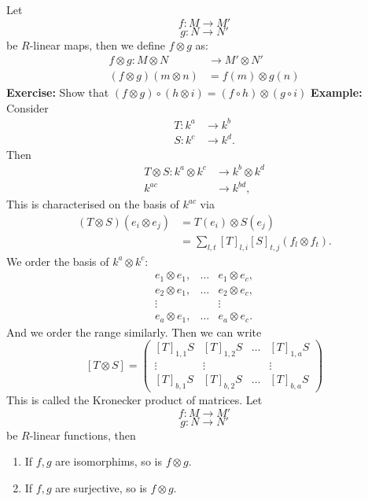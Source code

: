 \documentclass{article}
\begin{document}
    Let \[ f : M \to M'\] \[ g: N \to N' \]
    be $R$-linear maps, then we define $f \otimes g$ as: \begin{align*}
        f \otimes g : M \otimes N &\to M' \otimes N'\\
        (f \otimes g)(m \otimes n) &= f(m) \otimes g(n)
    \end{align*}
    \textbf{Exercise: } Show that $(f \otimes g) \circ (h \otimes i) = (f \circ h) \otimes (g \circ i)$ \gap
    \textbf{Example:} Consider \begin{align*}
        T : k^{a} &\to k^{b}\\
        S : k^{c} &\to k^{d}.
    \end{align*}
    Then \begin{align*}
        T \otimes S : k^{a} \otimes k^{c} &\to k^{b} \otimes k^{d}\\
                      k^{ac} &\to k^{bd},
    \end{align*}
    This is characterised on the basis of $k^{ac}$ via \begin{align*}
        (T \otimes S)(e_{i} \otimes e_{j}) &= T(e_{i}) \otimes S(e_{j})\\
        &= \sum_{l,t} \left[T \right]_{l,i} \left[ S \right]_{t,j}(f_{l} \otimes f_{t}).
    \end{align*}
    We order the basis of $k^{a} \otimes k^{c}$:\[
    \begin{matrix}
        e_{1} \otimes e_{1}, & \dots & e_{1} \otimes e_{c},\\
        e_{2} \otimes e_{1}, & \dots & e_{2} \otimes e_{c},\\
        \vdots & & \vdots\\
        e_{a}\otimes e_{1}, & \dots & e_{a}\otimes e_{c}.
    \end{matrix}\]
    And we order the range similarly. Then we can write \[ \left[T \otimes S \right] = \begin{pmatrix}
        [T]_{1,1}S & [T]_{1,2}S & \dots & [T]_{1,a} S\\
        \vdots & \vdots & & \vdots\\
        [T]_{b,1}S & [T]_{b,2}S & \dots & [T]_{b,a}S
    \end{pmatrix}
    \]
    This is called the Kronecker product of matrices.
    \prop Let \[ f:M \to M'\] \[g : N \to N'\] be $R$-linear functions, then \begin{enumerate}
        \item If $f,g$ are isomorphims, so is $f \otimes g$.
        \item If $f,g$ are surjective, so is $f \otimes g$.
    \end{enumerate}
\end{document}
